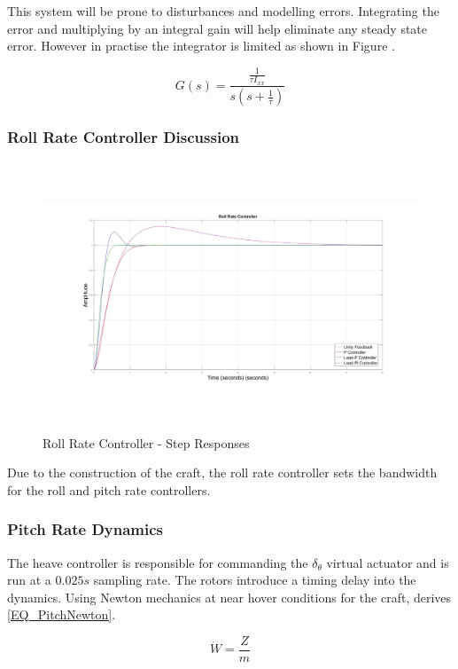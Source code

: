 	 This system will be prone to disturbances and modelling errors. Integrating the error and multiplying by an integral gain will help eliminate any steady state error. However in practise the integrator is limited as shown in Figure .
	 
	 \begin{equation}
	 \label{EQ_RollRateTF}
	 G(s) = \frac{\frac{1}{\tau I_{xx}}}{s (s + \frac{1}{\tau})}
	 \end{equation}
	 
	 
	 \subsubsection{Roll Rate Controller Discussion}
	 \begin{figure}[H]
	 	\centering
	 	\includegraphics[height = 8cm]{../Design/Matlab/Controllers/roll_rate_step.jpg}
	 	\caption{Roll Rate Controller -  Step Responses}
	 	\label{IM_RollRateStep}
	 \end{figure}
	 
	 
	 Due to the construction of the craft, the roll rate controller sets the bandwidth for the roll and pitch rate controllers. 
	 
	 
	 \subsubsection{Pitch Rate Dynamics}
	 The heave controller is responsible for commanding the $\delta_\theta$ virtual actuator and is run at a $0.025s$ sampling rate. The rotors introduce a timing delay into the dynamics. Using Newton mechanics at near hover conditions for the craft, derives \eqref{EQ_PitchNewton}. 
	 
	 \begin{equation}
	 \label{EQ_PitchNewton}
	 \dot{W} = \dfrac{Z}{m}
	 \end{equation}
	 
